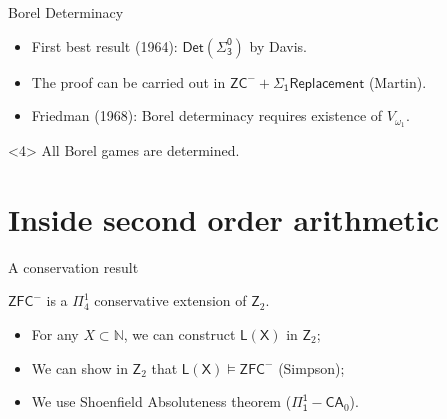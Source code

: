 \documentclass{beamer} %
\begin{document}

\begin{frame}{Borel Determinacy}
    \begin{itemize}
        \item<1-> First best result (1964): $\mathsf{Det(\Sigma^0_3)}$ by Davis.
        \item<2-> The proof can be carried out in $\mathsf{ZC^- + \Sigma_1 Replacement}$ (Martin).
        \item<3-> Friedman (1968): Borel determinacy requires existence of $V_{\omega_1}$. 
    \end{itemize}

    \begin{theorem}<4>
        All Borel games are determined.
    \end{theorem}

\end{frame}





    


\section{Inside second order arithmetic}

\begin{frame}{A conservation result}
    \begin{theorem}
        $\mathsf{ZFC}^-$ is a $\Pi^1_4$ conservative extension of $\mathsf{Z}_2$.    
    \end{theorem}
    
    \begin{itemize}
        \item<2-> For any $X \subset \mathbb{N}$, we can construct $\mathsf{L(X)}$ in $\mathsf{Z}_2$;
        \item<3-> We can show in $\mathsf{Z}_2$ that $\mathsf{L(X)} \models \mathsf{ZFC}^-$ (Simpson);
        \item<4-> We use Shoenfield Absoluteness theorem ($\mathsf{\Pi_1^1}-\mathsf{CA}_0$).
    \end{itemize}

\end{frame}
\end{document}
